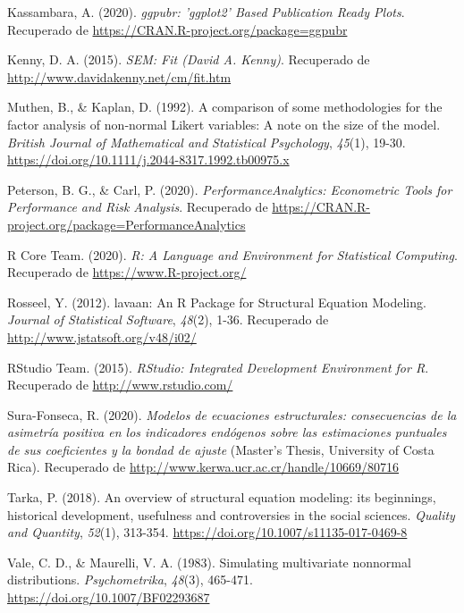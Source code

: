 \documentclass[
  english]{revcoles}
\newlength{\cslhangindent}
\newenvironment{cslreferences}%
  {\setlength{\parindent}{0pt}%
  \everypar{\setlength{\hangindent}{\cslhangindent}}\ignorespaces}%
  {\par}
\begin{document}
\begin{cslreferences}
\leavevmode\hypertarget{ref-ggpubr}{}%
Kassambara, A. (2020). \emph{ggpubr: 'ggplot2' Based Publication Ready
Plots}. Recuperado de \url{https://CRAN.R-project.org/package=ggpubr}

\leavevmode\hypertarget{ref-Kenny2015}{}%
Kenny, D. A. (2015). \emph{SEM: Fit (David A. Kenny)}. Recuperado de
\url{http://www.davidakenny.net/cm/fit.htm}

\leavevmode\hypertarget{ref-Muthen1992}{}%
Muthen, B., \& Kaplan, D. (1992). A comparison of some methodologies for
the factor analysis of non‐normal Likert variables: A note on the size
of the model. \emph{British Journal of Mathematical and Statistical
Psychology}, \emph{45}(1), 19-30.
\url{https://doi.org/10.1111/j.2044-8317.1992.tb00975.x}

\leavevmode\hypertarget{ref-PerformanceAnalytics}{}%
Peterson, B. G., \& Carl, P. (2020). \emph{PerformanceAnalytics:
Econometric Tools for Performance and Risk Analysis}. Recuperado de
\url{https://CRAN.R-project.org/package=PerformanceAnalytics}

\leavevmode\hypertarget{ref-R}{}%
R Core Team. (2020). \emph{R: A Language and Environment for Statistical
Computing}. Recuperado de \url{https://www.R-project.org/}

\leavevmode\hypertarget{ref-lavaan}{}%
Rosseel, Y. (2012). lavaan: An R Package for Structural Equation
Modeling. \emph{Journal of Statistical Software}, \emph{48}(2), 1-36.
Recuperado de \url{http://www.jstatsoft.org/v48/i02/}

\leavevmode\hypertarget{ref-RStudio}{}%
RStudio Team. (2015). \emph{RStudio: Integrated Development Environment
for R}. Recuperado de \url{http://www.rstudio.com/}

\leavevmode\hypertarget{ref-SuraFonseca2020}{}%
Sura-Fonseca, R. (2020). \emph{Modelos de ecuaciones estructurales:
consecuencias de la asimetría positiva en los indicadores endógenos
sobre las estimaciones puntuales de sus coeficientes y la bondad de
ajuste} (Master's Thesis, University of Costa Rica). Recuperado de
\url{http://www.kerwa.ucr.ac.cr/handle/10669/80716}

\leavevmode\hypertarget{ref-Tarka2018}{}%
Tarka, P. (2018). An overview of structural equation modeling: its
beginnings, historical development, usefulness and controversies in the
social sciences. \emph{Quality and Quantity}, \emph{52}(1), 313-354.
\url{https://doi.org/10.1007/s11135-017-0469-8}

\leavevmode\hypertarget{ref-Vale1983}{}%
Vale, C. D., \& Maurelli, V. A. (1983). Simulating multivariate
nonnormal distributions. \emph{Psychometrika}, \emph{48}(3), 465-471.
\url{https://doi.org/10.1007/BF02293687}


\end{cslreferences}
\end{document}
